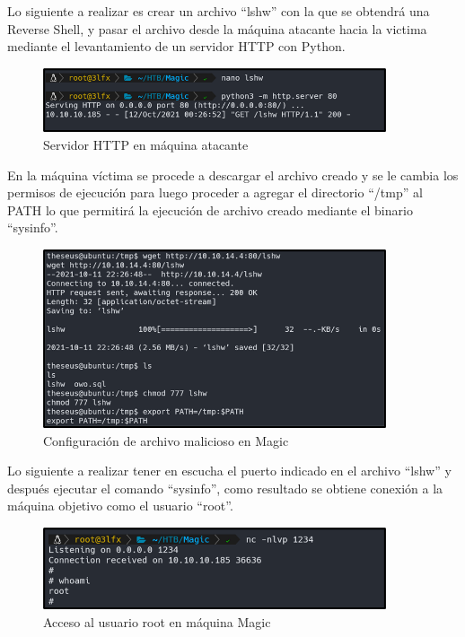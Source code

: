 Lo siguiente a realizar es crear un archivo “lshw” con la que se obtendrá una Reverse Shell, y pasar el archivo desde la máquina atacante hacia la victima mediante el levantamiento de un servidor HTTP con Python.
\begin{figure}[H]
    \centering
    \includegraphics[width=0.9\textwidth]{imagenes/seratma.png}
    \caption{Servidor HTTP en máquina atacante}
\end{figure}
En la máquina víctima se procede a descargar el archivo creado y se le cambia los permisos de ejecución para luego proceder a agregar el directorio “/tmp” al PATH lo que permitirá la ejecución de archivo creado mediante el binario “sysinfo”.
\begin{figure}[H]
    \centering
    \includegraphics[width=0.9\textwidth]{imagenes/armalmag.png}
    \caption{Configuración de archivo malicioso en Magic}
\end{figure}
Lo siguiente a realizar tener en escucha el puerto indicado en el archivo “lshw” y después ejecutar el comando “sysinfo”, como resultado se obtiene conexión a la máquina objetivo como el usuario “root”.
\begin{figure}[H]
    \centering
    \includegraphics[width=0.9\textwidth]{imagenes/acrootmag.png}
    \caption{Acceso al usuario root en máquina Magic}
\end{figure}
